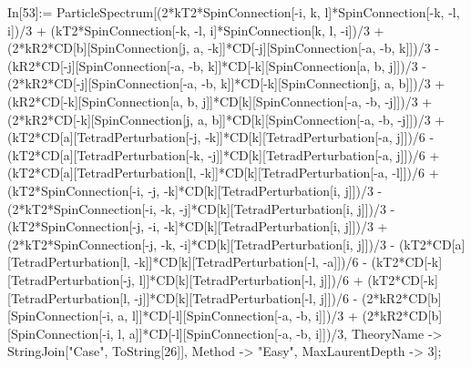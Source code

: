 In[53]:= ParticleSpectrum[(2*kT2*SpinConnection[-i, k, l]*SpinConnection[-k, -l, i])/3 + (kT2*SpinConnection[-k, -l, i]*SpinConnection[k, l, -i])/3 + (2*kR2*CD[b][SpinConnection[j, a, -k]]*CD[-j][SpinConnection[-a, -b, k]])/3 - (kR2*CD[-j][SpinConnection[-a, -b, k]]*CD[-k][SpinConnection[a, b, j]])/3 - (2*kR2*CD[-j][SpinConnection[-a, -b, k]]*CD[-k][SpinConnection[j, a, b]])/3 + (kR2*CD[-k][SpinConnection[a, b, j]]*CD[k][SpinConnection[-a, -b, -j]])/3 + (2*kR2*CD[-k][SpinConnection[j, a, b]]*CD[k][SpinConnection[-a, -b, -j]])/3 + (kT2*CD[a][TetradPerturbation[-j, -k]]*CD[k][TetradPerturbation[-a, j]])/6 - (kT2*CD[a][TetradPerturbation[-k, -j]]*CD[k][TetradPerturbation[-a, j]])/6 + (kT2*CD[a][TetradPerturbation[l, -k]]*CD[k][TetradPerturbation[-a, -l]])/6 + (kT2*SpinConnection[-i, -j, -k]*CD[k][TetradPerturbation[i, j]])/3 - (2*kT2*SpinConnection[-i, -k, -j]*CD[k][TetradPerturbation[i, j]])/3 - (kT2*SpinConnection[-j, -i, -k]*CD[k][TetradPerturbation[i, j]])/3 + (2*kT2*SpinConnection[-j, -k, -i]*CD[k][TetradPerturbation[i, j]])/3 - (kT2*CD[a][TetradPerturbation[l, -k]]*CD[k][TetradPerturbation[-l, -a]])/6 - (kT2*CD[-k][TetradPerturbation[-j, l]]*CD[k][TetradPerturbation[-l, j]])/6 + (kT2*CD[-k][TetradPerturbation[l, -j]]*CD[k][TetradPerturbation[-l, j]])/6 - (2*kR2*CD[b][SpinConnection[-i, a, l]]*CD[-l][SpinConnection[-a, -b, i]])/3 + (2*kR2*CD[b][SpinConnection[-i, l, a]]*CD[-l][SpinConnection[-a, -b, i]])/3, TheoryName -> StringJoin["Case", ToString[26]], Method -> "Easy", MaxLaurentDepth -> 3]; 